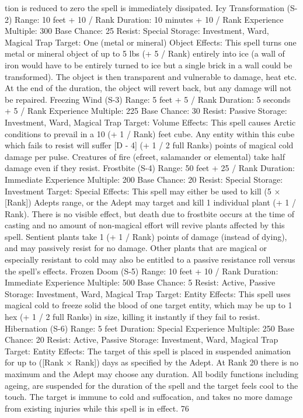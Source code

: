 \documentclass[a4paper]{article}
\begin{document}
\begin{multicols}{3}
tion is reduced to zero the spell is immediately
dissipated.
Icy Transformation (S-2)
Range: 10 feet + 10 / Rank
Duration: 10 minutes + 10 / Rank
Experience Multiple: 300
Base Chance: 25%
Resist: Special
Storage: Investment, Ward, Magical Trap
Target: One (metal or mineral) Object
Effects: This spell turns one metal or mineral object of up to 5 lbs (+ 5 / Rank) entirely into ice (a
wall of iron would have to be entirely turned to ice
but a single brick in a wall could be transformed).
The object is then transparent and vulnerable to
damage, heat etc. At the end of the duration, the
object will revert back, but any damage will not be
repaired.
Freezing Wind (S-3)
Range: 5 feet + 5 / Rank
Duration: 5 seconds + 5 / Rank
Experience Multiple: 225
Base Chance: 30%
Resist: Passive
Storage: Investment, Ward, Magical Trap
Target: Volume
Effects: This spell causes Arctic conditions to
prevail in a 10 (+ 1 / Rank) feet cube. Any entity
within this cube which fails to resist will suffer [D
- 4] (+ 1 / 2 full Ranks) points of magical cold
damage per pulse. Creatures of fire (efreet, salamander or elemental) take half damage even if they
resist.
Frostbite (S-4)
Range: 50 feet + 25 / Rank
Duration: Immediate
Experience Multiple: 200
Base Chance: 20%
Resist: Special
Storage: Investment
Target: Special
Effects: This spell may either be used to kill (5 ×
[Rank])%
Adepts range, or the Adept may target and kill 1
individual plant (+ 1 / Rank). There is no visible
effect, but death due to frostbite occurs at the time
of casting and no amount of non-magical effort
will revive plants affected by this spell. Sentient
plants take 1 (+ 1 / Rank) points of damage (instead of dying), and may passively resist for no
damage. Other plants that are magical or especially
resistant to cold may also be entitled to a passive
resistance roll versus the spell’s effects.
Frozen Doom (S-5)
Range: 10 feet + 10 / Rank
Duration: Immediate
Experience Multiple: 500
Base Chance: 5%
Resist: Active, Passive
Storage: Investment, Ward, Magical Trap
Target: Entity
Effects: This spell uses magical cold to freeze solid
the blood of one target entity, which may be up to
1 hex (+ 1 / 2 full Ranks) in size, killing it instantly
if they fail to resist.
Hibernation (S-6)
Range: 5 feet
Duration: Special
Experience Multiple: 250
Base Chance: 20%
Resist: Active, Passive
Storage: Investment, Ward, Magical Trap
Target: Entity
Effects: The target of this spell is placed in suspended animation for up to ([Rank × Rank]) days
as specified by the Adept. At Rank 20 there is no
maximum and the Adept may choose any duration.
All bodily functions including ageing, are suspended for the duration of the spell and the target
feels cool to the touch. The target is immune to
cold and suffocation, and takes no more damage
from existing injuries while this spell is in effect.
76


\end{multicols}
\end{document}
